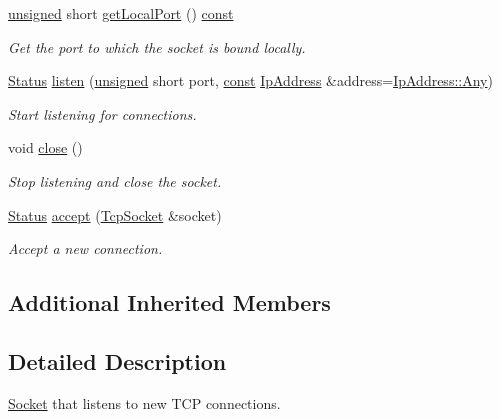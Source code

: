\begin{DoxyCompactItemize}
\hyperlink{curses_8priv_8h_aca40206900cfc164654362fa8d4ad1e6}{unsigned} short \hyperlink{classsf_1_1_tcp_listener_a3bb62b92684cd1a14b14efdaf0471440}{get\-Local\-Port} () \hyperlink{term__entry_8h_a57bd63ce7f9a353488880e3de6692d5a}{const} 
\begin{DoxyCompactList}\small\item\em Get the port to which the socket is bound locally. \end{DoxyCompactList}\item 
\hyperlink{classsf_1_1_socket_a51bf0fd51057b98a10fbb866246176dc}{Status} \hyperlink{classsf_1_1_tcp_listener_a9504758ea3570e62cb20b209c11776a1}{listen} (\hyperlink{curses_8priv_8h_aca40206900cfc164654362fa8d4ad1e6}{unsigned} short port, \hyperlink{term__entry_8h_a57bd63ce7f9a353488880e3de6692d5a}{const} \hyperlink{classsf_1_1_ip_address}{Ip\-Address} \&address=\hyperlink{classsf_1_1_ip_address_a3dbc10b0dc6804cc69e29342f7406907}{Ip\-Address\-::\-Any})
\begin{DoxyCompactList}\small\item\em Start listening for connections. \end{DoxyCompactList}\item 
void \hyperlink{classsf_1_1_tcp_listener_a3a00a850506bd0f9f48867a0fe59556b}{close} ()
\begin{DoxyCompactList}\small\item\em Stop listening and close the socket. \end{DoxyCompactList}\item 
\hyperlink{classsf_1_1_socket_a51bf0fd51057b98a10fbb866246176dc}{Status} \hyperlink{classsf_1_1_tcp_listener_ae2c83ce5a64d50b68180c46bef0a7346}{accept} (\hyperlink{classsf_1_1_tcp_socket}{Tcp\-Socket} \&socket)
\begin{DoxyCompactList}\small\item\em Accept a new connection. \end{DoxyCompactList}\end{DoxyCompactItemize}
\subsection*{Additional Inherited Members}


\subsection{Detailed Description}
\hyperlink{classsf_1_1_socket}{Socket} that listens to new T\-C\-P connections. 

